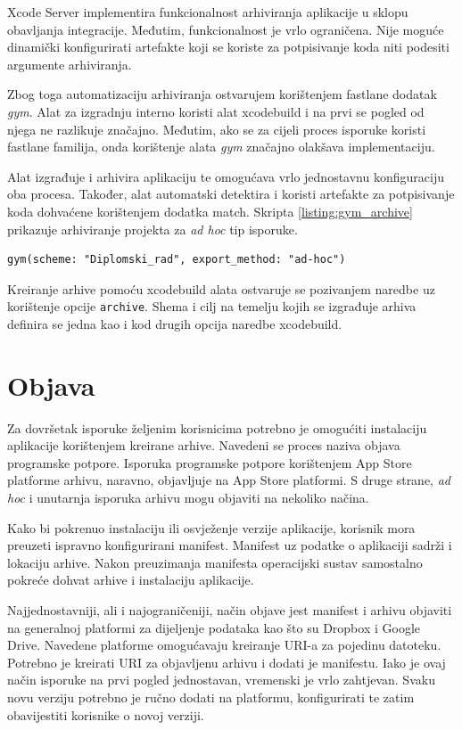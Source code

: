 \documentclass[times, utf8, diplomski, numeric]{fer}
\begin{document}
Xcode Server implementira funkcionalnost arhiviranja aplikacije u sklopu obavljanja integracije. Međutim, funkcionalnost je vrlo ograničena. Nije moguće dinamički konfigurirati artefakte koji se koriste za potpisivanje koda niti podesiti argumente arhiviranja.

Zbog toga automatizaciju arhiviranja ostvarujem korištenjem fastlane dodatak \textit{gym}. Alat za izgradnju interno koristi alat xcodebuild i na prvi se pogled od njega ne razlikuje značajno. Međutim, ako se za cijeli proces isporuke koristi fastlane familija, onda korištenje alata \textit{gym} značajno olakšava implementaciju.

Alat izgrađuje i arhivira aplikaciju te omogućava vrlo jednostavnu konfiguraciju oba procesa. Također, alat automatski detektira i koristi artefakte za potpisivanje koda dohvaćene korištenjem dodatka match. Skripta \ref{listing:gym_archive} prikazuje arhiviranje projekta za \textit{ad hoc} tip isporuke.

\begin{lstlisting}[caption=Arhiviranje aplikacije za ad hoc isporuku pomoću dodatka gym, label=listing:gym_archive]
gym(scheme: "Diplomski_rad", export_method: "ad-hoc")
\end{lstlisting}

Kreiranje arhive pomoću xcodebuild alata ostvaruje se pozivanjem naredbe uz korištenje opcije \verb|archive|. Shema i cilj na temelju kojih se izgrađuje arhiva definira se jedna kao i kod drugih opcija naredbe xcodebuild.


\section{Objava}

Za dovršetak isporuke željenim korisnicima potrebno je omogućiti instalaciju aplikacije korištenjem kreirane arhive. Navedeni se proces naziva objava programske potpore. Isporuka programske potpore korištenjem App Store platforme arhivu, naravno, objavljuje na App Store platformi. S druge strane, \textit{ad hoc} i unutarnja isporuka arhivu mogu objaviti na nekoliko načina.

Kako bi pokrenuo instalaciju ili osvježenje verzije aplikacije, korisnik mora preuzeti ispravno konfigurirani manifest. Manifest uz podatke o aplikaciji sadrži i lokaciju arhive. Nakon preuzimanja manifesta operacijski sustav samostalno pokreće dohvat arhive i instalaciju aplikacije.

Najjednostavniji, ali i najograničeniji, način objave jest manifest i arhivu objaviti na generalnoj platformi za dijeljenje podataka kao što su Dropbox i Google Drive. Navedene platforme omogućavaju kreiranje URI-a za pojedinu datoteku. Potrebno je kreirati URI za objavljenu arhivu i dodati je manifestu. Iako je ovaj način isporuke na prvi pogled jednostavan, vremenski je vrlo zahtjevan. Svaku novu verziju potrebno je ručno dodati na platformu, konfigurirati te zatim obavijestiti korisnike o novoj verziji.
\end{document}
